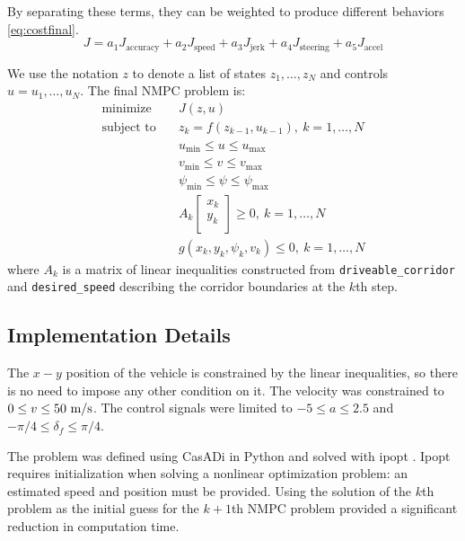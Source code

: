 \documentclass[letterpaper, 10 pt, conference]{ieeeconf}  %
\begin{document}
 By separating these terms, they can be weighted to produce different behaviors \eqref{eq:costfinal}.
 \begin{equation}
 J = a_1 J_{\text{accuracy}} + a_2 J_{\text{speed}} + a_3 J_{\text{jerk}} + a_4 J_{\text{steering}} + a_5J_{\text{accel}}
 \label{eq:costfinal}
 \end{equation}
 
 We use the notation $z$ to denote a list of states $z_1,\dots,z_N$ and controls $u=u_1,\dots,u_N$.
 The final NMPC problem is:
 \begin{align}
 \text{minimize}\quad& J(z, u)
 \\
 \text{subject to} \quad& z_{k} = f(z_{k-1}, u_{k-1}),\ k=1,\dots,N
 \\
 & u_{\min} \leq u \leq u_{\max}
 \\
 & v_{\min} \leq v \leq v_{\max}
 \\
 & \psi_{\min} \leq \psi \leq \psi_{\max}
 \\
 &
 A_k\begin{bmatrix}
 x_k\\y_k\\
 \end{bmatrix} \geq 0,\ k=1,\dots,N
 \\
 &
g(x_k, y_k, \psi_k, v_k) \leq 0,\ k=1,\dots,N
 \end{align}
 where $A_k$ is a matrix of linear inequalities constructed from \texttt{driveable\_corridor} and \texttt{desired\_speed} describing the corridor boundaries at the $k$th step.
 
 
 \subsection{Implementation Details}
The $x-y$ position of the vehicle is constrained by the linear inequalities, so there is no need to impose any other condition on it. The velocity was constrained to $0 \leq v \leq 50\ \text{m}/\text{s}$.
The control signals were limited to $-5 \leq a \leq 2.5$ and $-\pi/4 \leq \delta_f \leq \pi/4$.
 
 The problem was defined using CasADi in Python and solved with ipopt \cite{Casadi} \cite{ipopt}. Ipopt requires initialization when solving a nonlinear optimization problem: an estimated speed and position must be provided. Using the solution of the $k$th problem as the initial guess for the $k+1$th NMPC problem provided a significant reduction in computation time.
 
\end{document}
